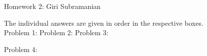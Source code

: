\documentclass[11pt,a4paper]{report}
\begin{document}
\begin{center}
{\large Homework 2: Giri Subramanian}
\end{center}

The individual answers are given in order in the respective boxes. \\
Problem 1:  
\vspace{1cm}
Problem 2: 
\newpage
Problem 3: 
\vspace{1cm}

Problem 4: 

 
\end{document}

